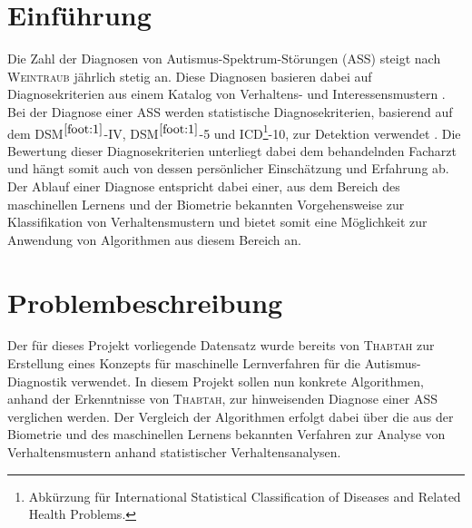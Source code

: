 \section{Einführung}
Die Zahl der Diagnosen von Autismus-Spektrum-Störungen (ASS) steigt nach \textsc{Weintraub} \cite{Weintraub2011} jährlich stetig an. Diese Diagnosen basieren dabei auf Diagnosekriterien aus einem Katalog von Verhaltens- und Interessensmustern \cite{Weintraub2011, Thabtah2017, Thabtah2018, VanElst2014}. Bei der Diagnose einer ASS werden statistische Diagnosekriterien, basierend auf dem DSM$^{\ref{foot:1}}$-IV, DSM$^{\ref{foot:1}}$-5 und ICD\footnote{\label{foot:2}Abkürzung für \glqq International Statistical Classification of Diseases and Related Health Problems\grqq{}.}-10, zur Detektion verwendet \cite{Thabtah2017, VanElst2014}. Die Bewertung dieser Diagnosekriterien unterliegt dabei dem behandelnden Facharzt und hängt somit auch von dessen persönlicher Einschätzung und Erfahrung ab. Der Ablauf einer Diagnose entspricht dabei einer, aus dem Bereich des maschinellen Lernens und der Biometrie bekannten Vorgehensweise zur Klassifikation von Verhaltensmustern und bietet somit eine Möglichkeit zur Anwendung von Algorithmen aus diesem Bereich an.

\section{Problembeschreibung}
Der für dieses Projekt vorliegende Datensatz wurde bereits von \textsc{Thabtah} \cite{Thabtah2017, Thabtah2018} zur Erstellung eines Konzepts für maschinelle Lernverfahren für die Autismus-Diagnostik verwendet.
In diesem Projekt sollen nun konkrete Algorithmen, anhand der Erkenntnisse von \textsc{Thabtah}, zur hinweisenden Diagnose einer ASS verglichen werden. %
Der Vergleich der Algorithmen erfolgt dabei über die aus der Biometrie und des maschinellen Lernens bekannten Verfahren zur Analyse von Verhaltensmustern anhand statistischer Verhaltensanalysen.